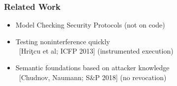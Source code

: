 \documentclass[12pt,english,dvipsnames]{beamer}
\begin{document}
\begin{frame}
    \frametitle{Related Work}
    \begin{itemize}
    \item Model Checking Security Protocols (not on code)
    \item Testing noninterference quickly \\
          ~[Hriţcu et al; ICFP 2013] (instrumented execution)
    \item Semantic foundations based on attacker knowledge \\
          ~[Chudnov, Naumann; S\&P 2018] (no revocation)
    \end{itemize}
\end{frame}
\end{document}

